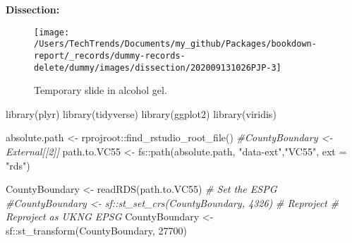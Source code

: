 \documentclass[
]{article}
\newenvironment{Shaded}{\begin{snugshade}}{\end{snugshade}}
\newcommand{\AttributeTok}[1]{\textcolor[rgb]{0.77,0.63,0.00}{#1}}
\newcommand{\CommentTok}[1]{\textcolor[rgb]{0.56,0.35,0.01}{\textit{#1}}}
\newcommand{\DecValTok}[1]{\textcolor[rgb]{0.00,0.00,0.81}{#1}}
\newcommand{\FunctionTok}[1]{\textcolor[rgb]{0.00,0.00,0.00}{#1}}
\newcommand{\NormalTok}[1]{#1}
\newcommand{\OtherTok}[1]{\textcolor[rgb]{0.56,0.35,0.01}{#1}}
\newcommand{\SpecialCharTok}[1]{\textcolor[rgb]{0.00,0.00,0.00}{#1}}
\newcommand{\StringTok}[1]{\textcolor[rgb]{0.31,0.60,0.02}{#1}}
\begin{document}
\textbf{Dissection:}

\begin{figure}

{\centering \texttt{[image: /Users/TechTrends/Documents/my\_github/Packages/bookdown-report/\_records/dummy-records-delete/dummy/images/dissection/202009131026PJP-3]} 

}

\caption{Temporary slide in alcohol gel.}\label{fig:unnamed-chunk-16}
\end{figure}

\begin{Shaded}
\begin{Highlighting}[]
\FunctionTok{library}\NormalTok{(plyr)}
\FunctionTok{library}\NormalTok{(tidyverse)}
\FunctionTok{library}\NormalTok{(ggplot2)}
\FunctionTok{library}\NormalTok{(viridis)}


\NormalTok{absolute.path }\OtherTok{\textless{}{-}}\NormalTok{ rprojroot}\SpecialCharTok{::}\FunctionTok{find\_rstudio\_root\_file}\NormalTok{()}
\CommentTok{\#CountyBoundary \textless{}{-} External[[2]]}
\NormalTok{path.to.VC55 }\OtherTok{\textless{}{-}}\NormalTok{ fs}\SpecialCharTok{::}\FunctionTok{path}\NormalTok{(absolute.path, }\StringTok{"data{-}ext"}\NormalTok{,}\StringTok{"VC55"}\NormalTok{, }\AttributeTok{ext =} \StringTok{"rds"}\NormalTok{)}

\NormalTok{CountyBoundary }\OtherTok{\textless{}{-}} \FunctionTok{readRDS}\NormalTok{(path.to.VC55)}
\CommentTok{\# Set the ESPG}
\CommentTok{\#CountyBoundary \textless{}{-} sf::st\_set\_crs(CountyBoundary, 4326)}
\CommentTok{\# Reproject}
\CommentTok{\# Reproject as UKNG EPSG }
\NormalTok{CountyBoundary }\OtherTok{\textless{}{-}}\NormalTok{ sf}\SpecialCharTok{::}\FunctionTok{st\_transform}\NormalTok{(CountyBoundary, }\DecValTok{27700}\NormalTok{)}
\end{Highlighting}
\end{Shaded}
\end{document}
